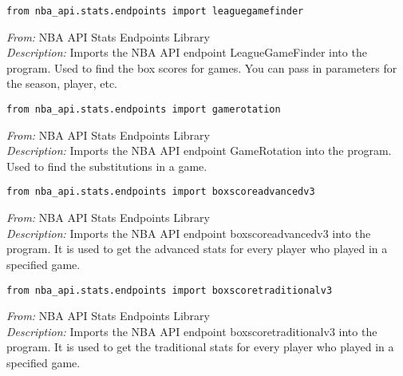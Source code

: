 \documentclass{article}
\begin{document}
\begin{lstlisting}
from nba_api.stats.endpoints import leaguegamefinder
\end{lstlisting}
\textit{From:} NBA API Stats Endpoints Library\\
\textit{Description:} Imports the NBA API endpoint LeagueGameFinder into the program. Used to find the box scores for games. You can pass in parameters for the season, player, etc.

\begin{lstlisting}
from nba_api.stats.endpoints import gamerotation
\end{lstlisting}
\textit{From:} NBA API Stats Endpoints Library\\
\textit{Description:} Imports the NBA API endpoint GameRotation into the program. Used to find the substitutions in a game.

\begin{lstlisting}
from nba_api.stats.endpoints import boxscoreadvancedv3
\end{lstlisting}
\textit{From:} NBA API Stats Endpoints Library\\
\textit{Description:} Imports the NBA API endpoint boxscoreadvancedv3 into the program. It is used to get the advanced stats for every player who played in a specified game.

\begin{lstlisting}
from nba_api.stats.endpoints import boxscoretraditionalv3
\end{lstlisting}
\textit{From:} NBA API Stats Endpoints Library\\
\textit{Description:} Imports the NBA API endpoint boxscoretraditionalv3 into the program. It is used to get the traditional stats for every player who played in a specified game.
\end{document}
